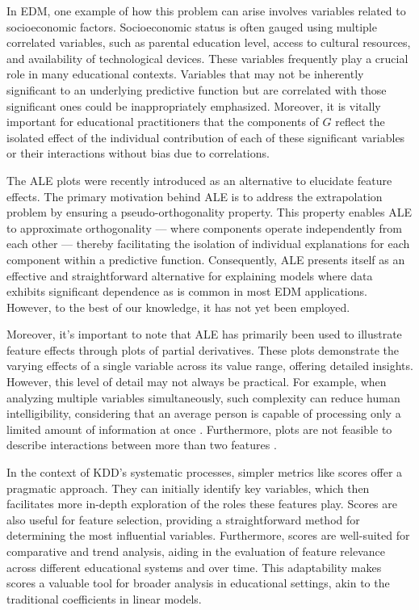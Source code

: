 In \gls{EDM}, one example of how this problem can arise involves variables related to socioeconomic factors. Socioeconomic status is often gauged using multiple correlated variables, such as parental education level, access to cultural resources, and availability of technological devices. These variables frequently play a crucial role in many educational contexts. Variables that may not be inherently significant to an underlying predictive function but are correlated with those significant ones could be inappropriately emphasized. Moreover, it is vitally important for educational practitioners that the components of \(G\) reflect the isolated effect of the individual contribution of each of these significant variables or their interactions without bias due to correlations.

The \gls{ALE} plots \cite{Apley2020VisualizingModels} were recently introduced as an alternative to elucidate feature effects. The primary motivation behind \gls{ALE} is to address the extrapolation problem by ensuring a pseudo-orthogonality property. This property enables ALE to approximate orthogonality — where components operate independently from each other — thereby facilitating the isolation of individual explanations for each component within a predictive function. Consequently, \gls{ALE} presents itself as an effective and straightforward alternative for explaining models where data exhibits significant dependence as is common in most \gls{EDM} applications. However, to the best of our knowledge, it has not yet been employed. 

Moreover, it's important to note that \gls{ALE} has primarily been used to illustrate feature effects through plots of partial derivatives. These plots demonstrate the varying effects of a single variable across its value range, offering detailed insights. However, this level of detail may not always be practical. For example, when analyzing multiple variables simultaneously, such complexity can reduce human intelligibility, considering that an average person is capable of processing only a limited amount of information at once \cite{Miller1956TheInformation.}. Furthermore, plots are not feasible to describe interactions between more than two features \cite{Apley2020VisualizingModels}.

In the context of \gls{KDD}'s systematic processes, simpler metrics like scores offer a pragmatic approach. They can initially identify key variables, which then facilitates more in-depth exploration of the roles these features play. Scores are also useful for feature selection, providing a straightforward method for determining the most influential variables. Furthermore, scores are well-suited for comparative and trend analysis, aiding in the evaluation of feature relevance across different educational systems and over time. This adaptability makes scores a valuable tool for broader analysis in educational settings, akin to the traditional coefficients in linear models.

